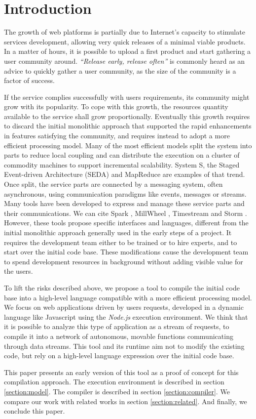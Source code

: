 \section{Introduction}

The growth of web platforms is partially due to Internet's capacity to stimulate services development, allowing very quick releases of a minimal viable products.
In a matter of hours, it is possible to upload a first product and start gathering a user community around.
\textit{``Release early, release often''} is commonly heard as an advice to quickly gather a user community, as the size of the community is a factor of success.

If the service complies successfully with users requirements, its community might grow with its popularity.
To cope with this growth, the resources quantity available to the service shall grow proportionally.
Eventually this growth requires to discard the initial monolithic approach that supported the rapid enhancements in features satisfying the community, and requires instead to adopt a more efficient processing model.
Many of the most efficient models split the system into parts to reduce local coupling and can distribute the execution on a cluster of commodity machines\cite{Fox1997} to support incremental scalability.
System S\cite{Jain2006,Wu2007}, the Staged Event-driven Architecture (SEDA)\cite{Welsh2000} and MapReduce \cite{Dean2008} are examples of that trend.
Once split, the service parts are connected by a messaging system, often asynchronous, using communication paradigms like events, messages or streams.
Many tools have been developed to express and manage these service parts and their communications.
We can cite Spark \cite{Zaharia2010}, MillWheel \cite{Akidau2013}, Timestream \cite{Qian2013} and Storm \cite{Marz2011}.
However, these tools propose specific interfaces and languages, different from the initial monolithic approach generally used in the early steps of a project.
It requires the development team either to be trained or to hire experts, and to start over the initial code base.
These modifications cause the development team to spend development resources in background without adding visible value for the users.

To lift the risks described above, we propose a tool to compile the initial code base into a high-level language compatible with a more efficient processing model.
We focus on web applications driven by users requests, developed in a dynamic language like Javascript using the \textit{Node.js} execution environment.
We think that it is possible to analyze this type of application as a stream of requests, to compile it into a network of autonomous, movable functions communicating through data streams.
This tool and its runtime aim not to modify the existing code, but rely on a high-level language expression over the initial code base.

This paper presents an early version of this tool as a proof of concept for this compilation approach.
The execution environment is described in section \ref{section:model}.
The compiler is described in section \ref{section:compiler}.
We compare our work with related works in section \ref{section:related}.
And finally, we conclude this paper.